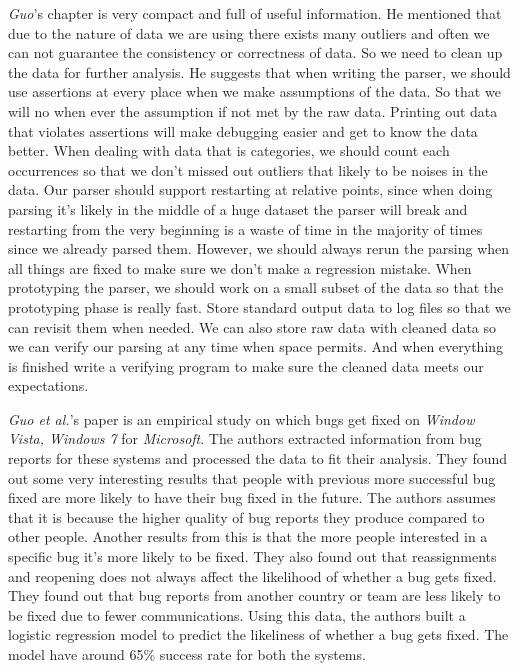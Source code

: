 \documentclass[sigconf]{acmart}
\begin{document}
{\it Guo}'s chapter is very compact and full of useful information. He mentioned that due to the nature of data we are using there exists many outliers and often we can not guarantee the consistency or correctness of data. So we need to clean up the data for further analysis. He suggests that when writing the parser, we should use assertions at every place when we make assumptions of the data. So that we will no when ever the assumption if not met by the raw data. Printing out data that violates assertions will make debugging easier and get to know the data better. When dealing with data that is categories, we should count each occurrences so that we don't missed out outliers that likely to be noises in the data. Our parser should support restarting at relative points, since when doing parsing it's likely in the middle of a huge dataset the parser will break and restarting from the very beginning is a waste of time in the majority of times since we already parsed them. However, we should always rerun the parsing when all things are fixed to make sure we don't make a regression mistake.  When prototyping the parser, we should work on a small subset of the data so that the prototyping phase is really fast. Store standard output data to log files so that we can revisit them when needed. We can also store raw data with cleaned data so we can verify our parsing at any time when space permits. And when everything is finished write a verifying program to make sure the cleaned data meets our expectations.

{\it Guo et al.}'s paper is an empirical study on which bugs get fixed on {\it Window Vista, Windows 7} for {\it Microsoft}. The authors extracted information from bug reports for these systems and processed the data to fit their analysis. They found out some very interesting results that people with previous more successful bug fixed are more likely to have their bug fixed in the future. The authors assumes that it is because the higher quality of bug reports they produce compared to other people. Another results from this is that the more people interested in a specific bug it's more likely to be fixed. They also found out that reassignments and reopening does not always affect the likelihood of whether a bug gets fixed. They found out that bug reports from another country or team are less likely to be fixed due to fewer communications. Using this data, the authors built a logistic regression model to predict the likeliness of whether a bug gets fixed. The model have around 65\% success rate for both the systems.
\end{document}
